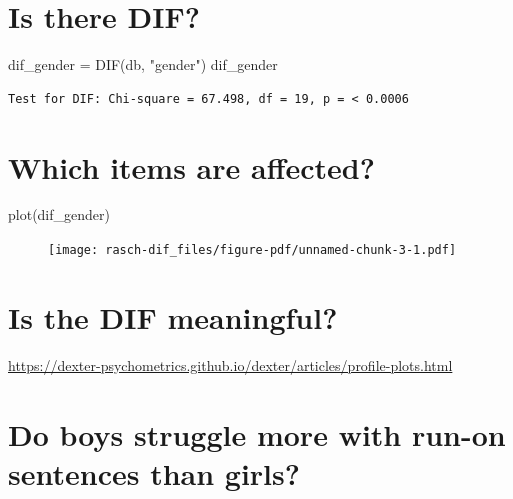 \documentclass[
  letterpaper,
  DIV=11,
  numbers=noendperiod]{scrreprt}
\newenvironment{Shaded}{\begin{snugshade}}{\end{snugshade}}
\newcommand{\FunctionTok}[1]{\textcolor[rgb]{0.28,0.35,0.67}{#1}}
\newcommand{\NormalTok}[1]{\textcolor[rgb]{0.00,0.23,0.31}{#1}}
\newcommand{\OtherTok}[1]{\textcolor[rgb]{0.00,0.23,0.31}{#1}}
\newcommand{\StringTok}[1]{\textcolor[rgb]{0.13,0.47,0.30}{#1}}
\begin{document}
\hypertarget{is-there-dif}{%
\section{Is there DIF?}\label{is-there-dif}}

\begin{Shaded}
\begin{Highlighting}[]
\NormalTok{dif\_gender }\OtherTok{=} \FunctionTok{DIF}\NormalTok{(db, }\StringTok{"gender"}\NormalTok{)}
\NormalTok{dif\_gender}
\end{Highlighting}
\end{Shaded}

\begin{verbatim}
Test for DIF: Chi-square = 67.498, df = 19, p = < 0.0006
\end{verbatim}

\hypertarget{which-items-are-affected}{%
\section{Which items are affected?}\label{which-items-are-affected}}

\begin{Shaded}
\begin{Highlighting}[]
    \FunctionTok{plot}\NormalTok{(dif\_gender)}
\end{Highlighting}
\end{Shaded}

\begin{figure}[H]

{\centering \texttt{[image: rasch-dif\_files/figure-pdf/unnamed-chunk-3-1.pdf]}

}

\end{figure}

\hypertarget{is-the-dif-meaningful}{%
\section{Is the DIF meaningful?}\label{is-the-dif-meaningful}}

\url{https://dexter-psychometrics.github.io/dexter/articles/profile-plots.html}

\hypertarget{do-boys-struggle-more-with-run-on-sentences-than-girls}{%
\section{Do boys struggle more with run-on sentences than
girls?}\label{do-boys-struggle-more-with-run-on-sentences-than-girls}}
\end{document}
